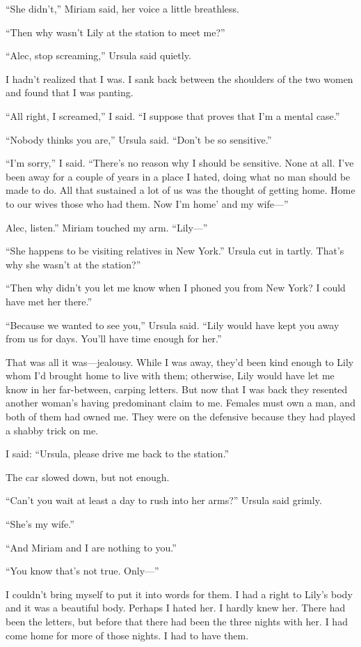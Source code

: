\documentclass{novel}
\begin{document}
“She didn’t,” Miriam said, her voice a little breathless.

“Then why wasn’t Lily at the station to meet me?”

“Alec, stop screaming,” Ursula said quietly.

I hadn’t realized that I was. I sank back between the shoulders of the two women and found that I was panting.

“All right, I screamed,” I said. “I suppose that proves that I’m a mental case.”

“Nobody thinks you are,” Ursula said. “Don’t be so sensitive.”

“I’m sorry,” I said. “There’s no reason why I should be sensitive. None at all. I’ve been away for a couple of years in a place I hated, doing what no man should be made to do. All that sustained a lot of us was the thought of getting home. Home to our wives those who had them. Now I’m home’ and my wife—”

Alec, listen.” Miriam touched my arm. “Lily—”

“She happens to be visiting relatives in New York.” Ursula cut in tartly. That’s why she wasn’t at the station?”

“Then why didn’t you let me know when I phoned you from New York? I could have met her there.”

“Because we wanted to see you,” Ursula said. “Lily would have kept you away from us for days. You’ll have time enough for her.”

That was all it was—jealousy. While I was away, they’d been kind enough to Lily whom I’d brought home to live with them; otherwise, Lily would have let me know in her far-between, carping letters. But now that I was back they resented another woman’s having predominant claim to me. Females must own a man, and both of them had owned me. They were on the defensive because they had played a shabby trick on me.

I said: “Ursula, please drive me back to the station.”

The car slowed down, but not enough.

“Can’t you wait at least a day to rush into her arms?” Ursula said grimly.

“She’s my wife.”

“And Miriam and I are nothing to you.”

“You know that’s not true. Only—”

I couldn’t bring myself to put it into words for them. I had a right to Lily’s body and it was a beautiful body. Perhaps I hated her. I hardly knew her. There had been the letters, but before that there had been the three nights with her. I had come home for more of those nights. I had to have them.
\end{document}
